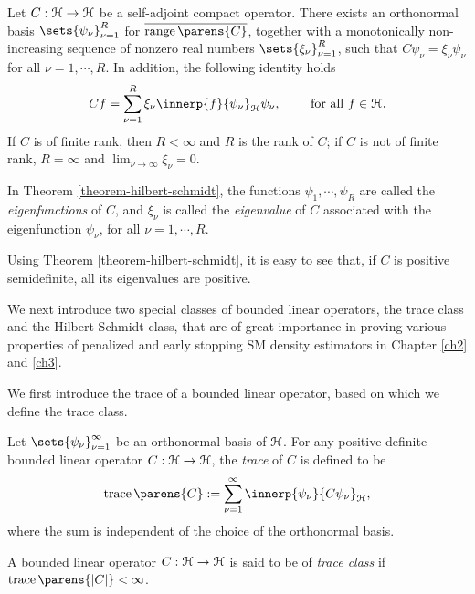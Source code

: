 \begin{theorem}\label{theorem-hilbert-schmidt}
	Let $C: \mathcal{H} \to \mathcal{H}$ be a self-adjoint compact operator. There exists an orthonormal basis $\sets{\psi_{\nu}}_{\nu=1}^R$ for $\overline{\range \parens{C}}$, together with a monotonically non-increasing sequence of nonzero real numbers $\sets{\xi_{\nu}}_{\nu=1}^R$, such that $C \psi_{\nu} = \xi_{\nu} \psi_{\nu}$ for all $\nu = 1, \cdots, R$. In addition, the following identity holds 
	\begin{align*}
		C f = \sum_{\nu=1}^R \xi_{\nu} \innerp{f}{\psi_{\nu}}_{\calH} \psi_{\nu}, \qquad \text{ for all } f \in \calH. 
	\end{align*}
	If $C$ is of finite rank, then $R < \infty$ and $R$ is the rank of $C$; if $C$ is not of finite rank, $R = \infty$ and $\lim_{\nu \to \infty} \xi_{\nu} = 0$. 
\end{theorem}

In Theorem \ref{theorem-hilbert-schmidt}, the functions $\psi_{1}, \cdots, \psi_{R}$ are called the \textit{eigenfunctions} of $C$, and $\xi_{\nu}$ is called the \textit{eigenvalue} of $C$ associated with the eigenfunction $\psi_{\nu}$, for all $\nu = 1, \cdots, R$. 

Using Theorem \ref{theorem-hilbert-schmidt}, it is easy to see that, if $C$ is positive semidefinite, all its eigenvalues are positive. 

We next introduce two special classes of bounded linear operators, the trace class and the Hilbert-Schmidt class, that are of great importance in proving various properties of penalized and early stopping SM density estimators in Chapter \ref{ch2} and \ref{ch3}. 

We first introduce the trace of a bounded linear operator, based on which we define the trace class. 

\begin{definition}[Trace]
	Let $\sets{\psi_{\nu}}_{\nu=1}^{\infty}$ be an orthonormal basis of $\mathcal{H}$. For any positive definite bounded linear operator $C: \mathcal{H} \to \mathcal{H}$, the \textit{trace} of $C$ is defined to be 
	\begin{align*}
		\trace \parens{C} := \sum_{\nu=1}^{\infty} \innerp{\psi_{\nu}}{C \psi_{\nu}}_{\calH}, 
	\end{align*}
	where the sum is independent of the choice of the orthonormal basis. 
\end{definition}

\begin{definition}
	A bounded linear operator $C: \mathcal{H} \to \mathcal{H}$ is said to be of \textit{trace class} if $\tr \parens{\abs{C}} < \infty$. 
\end{definition}

